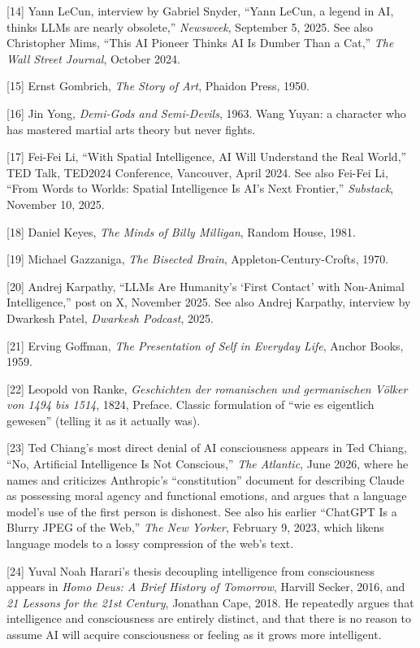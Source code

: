 \documentclass[11pt]{article}
\renewcommand{\\}[1][\mynewlineskip]{\oldnewline[#1]}
\begin{document}
{[14]} Yann LeCun, interview by Gabriel Snyder, ``Yann LeCun, a legend in AI, thinks LLMs are nearly obsolete,'' \textit{Newsweek}, September 5, 2025. See also Christopher Mims, ``This AI Pioneer Thinks AI Is Dumber Than a Cat,'' \textit{The Wall Street Journal}, October 2024.

{[15]} Ernst Gombrich, \textit{The Story of Art}, Phaidon Press, 1950.

{[16]} Jin Yong, \textit{Demi-Gods and Semi-Devils}, 1963. Wang Yuyan: a character who has mastered martial arts theory but never fights.

{[17]} Fei-Fei Li, ``With Spatial Intelligence, AI Will Understand the Real World,'' TED Talk, TED2024 Conference, Vancouver, April 2024. See also Fei-Fei Li, ``From Words to Worlds: Spatial Intelligence Is AI's Next Frontier,'' \textit{Substack}, November 10, 2025.

{[18]} Daniel Keyes, \textit{The Minds of Billy Milligan}, Random House, 1981.

{[19]} Michael Gazzaniga, \textit{The Bisected Brain}, Appleton-Century-Crofts, 1970.

{[20]} Andrej Karpathy, ``LLMs Are Humanity's `First Contact' with Non-Animal Intelligence,'' post on X, November 2025. See also Andrej Karpathy, interview by Dwarkesh Patel, \textit{Dwarkesh Podcast}, 2025.

{[21]} Erving Goffman, \textit{The Presentation of Self in Everyday Life}, Anchor Books, 1959.

{[22]} Leopold von Ranke, \textit{Geschichten der romanischen und germanischen V\"olker von 1494 bis 1514}, 1824, Preface. Classic formulation of ``wie es eigentlich gewesen'' (telling it as it actually was).

{[23]} Ted Chiang's most direct denial of AI consciousness appears in Ted Chiang, ``No, Artificial Intelligence Is Not Conscious,'' \textit{The Atlantic}, June 2026, where he names and criticizes Anthropic's ``constitution'' document for describing Claude as possessing moral agency and functional emotions, and argues that a language model's use of the first person is dishonest. See also his earlier ``ChatGPT Is a Blurry JPEG of the Web,'' \textit{The New Yorker}, February 9, 2023, which likens language models to a lossy compression of the web's text.

{[24]} Yuval Noah Harari's thesis decoupling intelligence from consciousness appears in \textit{Homo Deus: A Brief History of Tomorrow}, Harvill Secker, 2016, and \textit{21 Lessons for the 21st Century}, Jonathan Cape, 2018. He repeatedly argues that intelligence and consciousness are entirely distinct, and that there is no reason to assume AI will acquire consciousness or feeling as it grows more intelligent.
\end{document}
